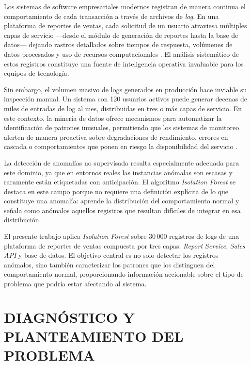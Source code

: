 \documentclass[12pt,letterpaper, oneside]{book}
\begin{document}
    Los sistemas de software empresariales modernos registran de manera
    continua el comportamiento de cada transacción a través de archivos
    de \textit{log}. En una plataforma de reportes de ventas, cada solicitud
    de un usuario atraviesa múltiples capas de servicio —desde el módulo
    de generación de reportes hasta la base de datos— dejando rastros
    detallados sobre tiempos de respuesta, volúmenes de datos procesados
    y uso de recursos computacionales \citep{he2016experience}. El análisis
    sistemático de estos registros constituye una fuente de inteligencia
    operativa invaluable para los equipos de tecnología.

    Sin embargo, el volumen masivo de logs generados en producción hace
    inviable su inspección manual. Un sistema con 120 usuarios activos
    puede generar decenas de miles de entradas de log al mes, distribuidas
    en tres o más capas de servicio. En este contexto, la minería de datos
    ofrece mecanismos para automatizar la identificación de patrones
    inusuales, permitiendo que los sistemas de monitoreo alerten de manera
    proactiva sobre degradaciones de rendimiento, errores en cascada o
    comportamientos que ponen en riesgo la disponibilidad del servicio
    \citep{chandola2009anomaly}.

    La detección de anomalías no supervisada resulta especialmente adecuada
    para este dominio, ya que en entornos reales las instancias anómalas
    son escasas y raramente están etiquetadas con anticipación. El algoritmo
    \textit{Isolation Forest} \citep{liu2008isolation} se destaca en este
    campo porque no requiere una definición explícita de lo que constituye
    una anomalía: aprende la distribución del comportamiento normal y señala
    como anómalos aquellos registros que resultan difíciles de integrar en
    esa distribución.

    El presente trabajo aplica \textit{Isolation Forest} sobre 30\,000
    registros de logs de una plataforma de reportes de ventas compuesta
    por tres capas: \textit{Report Service}, \textit{Sales API} y base de
    datos. El objetivo central es no solo detectar los registros anómalos,
    sino también caracterizar los patrones que los distinguen del
    comportamiento normal, proporcionando información accionable sobre el
    tipo de problema que podría estar afectando al sistema.

    \chapter{DIAGNÓSTICO Y PLANTEAMIENTO DEL PROBLEMA}
\end{document}
